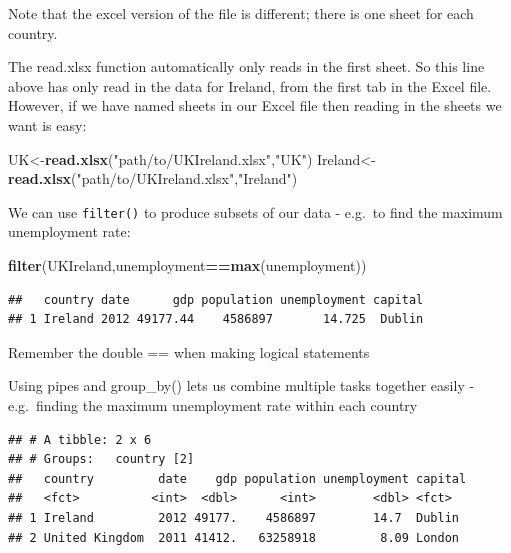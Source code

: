 \documentclass[]{book}
\newenvironment{Shaded}{\begin{snugshade}}{\end{snugshade}}
\newcommand{\KeywordTok}[1]{\textcolor[rgb]{0.13,0.29,0.53}{\textbf{#1}}}
\newcommand{\NormalTok}[1]{#1}
\newcommand{\OperatorTok}[1]{\textcolor[rgb]{0.81,0.36,0.00}{\textbf{#1}}}
\newcommand{\StringTok}[1]{\textcolor[rgb]{0.31,0.60,0.02}{#1}}
\begin{document}
Note that the excel version of the file is different; there is one sheet for each country.

The read.xlsx function automatically only reads in the first sheet. So this line above has only read in the data for Ireland, from the first tab in the Excel file. However, if we have named sheets in our Excel file then reading in the sheets we want is easy:

\begin{Shaded}
\begin{Highlighting}[]
\NormalTok{UK<-}\KeywordTok{read.xlsx}\NormalTok{(}\StringTok{"path/to/UKIreland.xlsx"}\NormalTok{,}\StringTok{"UK"}\NormalTok{)}
\NormalTok{Ireland<-}\KeywordTok{read.xlsx}\NormalTok{(}\StringTok{"path/to/UKIreland.xlsx"}\NormalTok{,}\StringTok{"Ireland"}\NormalTok{)}
\end{Highlighting}
\end{Shaded}

We can use \texttt{filter()} to produce subsets of our data - e.g.~to find the maximum unemployment rate:

\begin{Shaded}
\begin{Highlighting}[]
\KeywordTok{filter}\NormalTok{(UKIreland,unemployment}\OperatorTok{==}\KeywordTok{max}\NormalTok{(unemployment))}
\end{Highlighting}
\end{Shaded}

\begin{verbatim}
##   country date      gdp population unemployment capital
## 1 Ireland 2012 49177.44    4586897       14.725  Dublin
\end{verbatim}

Remember the double == when making logical statements

Using pipes and group\_by() lets us combine multiple tasks together easily - e.g.~finding the maximum unemployment rate within each country

\begin{Shaded}
\end{Shaded}

\begin{verbatim}
## # A tibble: 2 x 6
## # Groups:   country [2]
##   country         date    gdp population unemployment capital
##   <fct>          <int>  <dbl>      <int>        <dbl> <fct>  
## 1 Ireland         2012 49177.    4586897        14.7  Dublin 
## 2 United Kingdom  2011 41412.   63258918         8.09 London
\end{verbatim}
\end{document}
